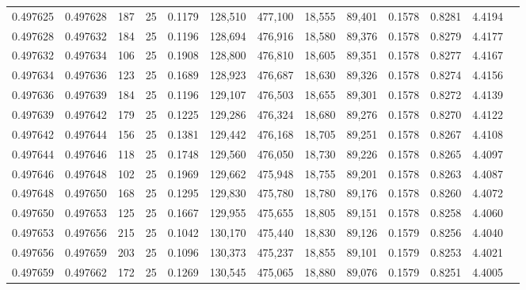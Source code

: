 \begin{tabular}{rrrrrrrrrrrrr}
0.497625 & 0.497628 & 187 &  25 &                                     0.1179 & 128,510 & 477,100 &  18,555 &  89,401 & 0.1578 & 0.8281 & 4.4194 \\
0.497628 & 0.497632 & 184 &  25 &                                     0.1196 & 128,694 & 476,916 &  18,580 &  89,376 & 0.1578 & 0.8279 & 4.4177 \\
0.497632 & 0.497634 & 106 &  25 &                                     0.1908 & 128,800 & 476,810 &  18,605 &  89,351 & 0.1578 & 0.8277 & 4.4167 \\
0.497634 & 0.497636 & 123 &  25 &                                     0.1689 & 128,923 & 476,687 &  18,630 &  89,326 & 0.1578 & 0.8274 & 4.4156 \\
0.497636 & 0.497639 & 184 &  25 &                                     0.1196 & 129,107 & 476,503 &  18,655 &  89,301 & 0.1578 & 0.8272 & 4.4139 \\
0.497639 & 0.497642 & 179 &  25 &                                     0.1225 & 129,286 & 476,324 &  18,680 &  89,276 & 0.1578 & 0.8270 & 4.4122 \\
0.497642 & 0.497644 & 156 &  25 &                                     0.1381 & 129,442 & 476,168 &  18,705 &  89,251 & 0.1578 & 0.8267 & 4.4108 \\
0.497644 & 0.497646 & 118 &  25 &                                     0.1748 & 129,560 & 476,050 &  18,730 &  89,226 & 0.1578 & 0.8265 & 4.4097 \\
0.497646 & 0.497648 & 102 &  25 &                                     0.1969 & 129,662 & 475,948 &  18,755 &  89,201 & 0.1578 & 0.8263 & 4.4087 \\
0.497648 & 0.497650 & 168 &  25 &                                     0.1295 & 129,830 & 475,780 &  18,780 &  89,176 & 0.1578 & 0.8260 & 4.4072 \\
0.497650 & 0.497653 & 125 &  25 &                                     0.1667 & 129,955 & 475,655 &  18,805 &  89,151 & 0.1578 & 0.8258 & 4.4060 \\
0.497653 & 0.497656 & 215 &  25 &                                     0.1042 & 130,170 & 475,440 &  18,830 &  89,126 & 0.1579 & 0.8256 & 4.4040 \\
0.497656 & 0.497659 & 203 &  25 &                                     0.1096 & 130,373 & 475,237 &  18,855 &  89,101 & 0.1579 & 0.8253 & 4.4021 \\
0.497659 & 0.497662 & 172 &  25 &                                     0.1269 & 130,545 & 475,065 &  18,880 &  89,076 & 0.1579 & 0.8251 & 4.4005 \\

\end{tabular}
